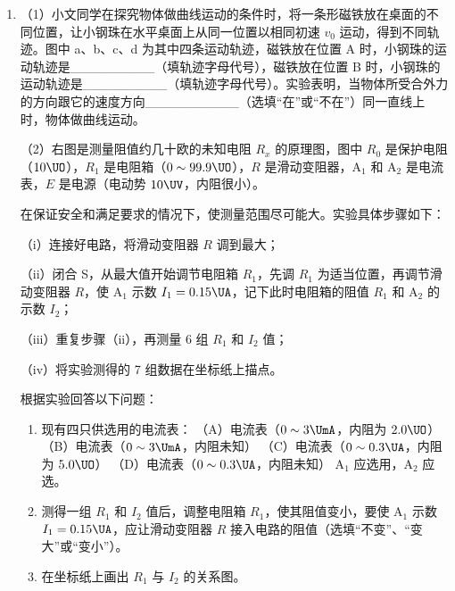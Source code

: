 \documentclass[\gkver]{gaokaozhenti}
\begin{document}
\begin{enumerate}
\item
（1）小文同学在探究物体做曲线运动的条件时，将一条形磁铁放在桌面的不同位置，让小钢珠在水平桌面上从同一位置以相同初速 $v_{0}$ 运动，得到不同轨迹。图中 a、b、c、d 为其中四条运动轨迹，磁铁放在位置 A 时，小钢珠的运动轨迹是\_\_\_\_\_\_\_\_\_（填轨迹字母代号），磁铁放在位置 B 时，小钢珠的运动轨迹是\_\_\_\_\_\_\_\_\_（填轨迹字母代号）。实验表明，当物体所受合外力的方向跟它的速度方向\_\_\_\_\_\_\_\_\_\_（选填“在”或“不在”）同一直线上时，物体做曲线运动。

\onepicture[align=right, w=5.96cm]{}

（2）右图是测量阻值约几十欧的未知电阻 $R_{x}$ 的原理图，图中 $R_{0}$ 是保护电阻（$10\UO$），$R_{1}$ 是电阻箱（$0\sim 99.9\UO$），$R$ 是滑动变阻器，A$_{1}$ 和 A$_{2}$ 是电流表，$E$ 是电源（电动势 $10\UV$，内阻很小）。

在保证安全和满足要求的情况下，使测量范围尽可能大。实验具体步骤如下：

（i）连接好电路，将滑动变阻器 $R$ 调到最大；

（ii）闭合 S，从最大值开始调节电阻箱 $R_{1}$，先调 $R_{1}$ 为适当位置，再调节滑动变阻器 $R$，使 A$_{1}$ 示数 $I_{1}=0.15\UA$，记下此时电阻箱的阻值 $R_{1}$ 和 A$_{2}$ 的示数 $I_{2}$；

（iii）重复步骤（ii），再测量 6 组 $R_{1}$ 和 $I_{2}$ 值；

（iv）将实验测得的 7 组数据在坐标纸上描点。

根据实验回答以下问题：

\begin{enumerate}
	\item
	现有四只供选用的电流表：
	（A）电流表（$0\sim 3\UmA$，内阻为 $2.0\UO$）
	（B）电流表（$0\sim 3\UmA$，内阻未知）
	（C）电流表（$0\sim 0.3\UA$，内阻为 $5.0\UO$）
	（D）电流表（$0\sim 0.3\UA$，内阻未知）
	A$_{1}$ 应选用，A$_{2}$ 应选。

	\item
	测得一组 $R_{1}$ 和 $I_{2}$ 值后，调整电阻箱 $R_{1}$，使其阻值变小，要使 A$_{1}$ 示数 $I_{1}=0.15\UA$，应让滑动变阻器 $R$ 接入电路的阻值（选填“不变”、“变大”或“变小”）。

	\item
	在坐标纸上画出 $R_{1}$ 与 $I_{2}$ 的关系图。
	\onepicture[w=5.29cm]{}


\end{enumerate}
\end{enumerate}
\end{document}
